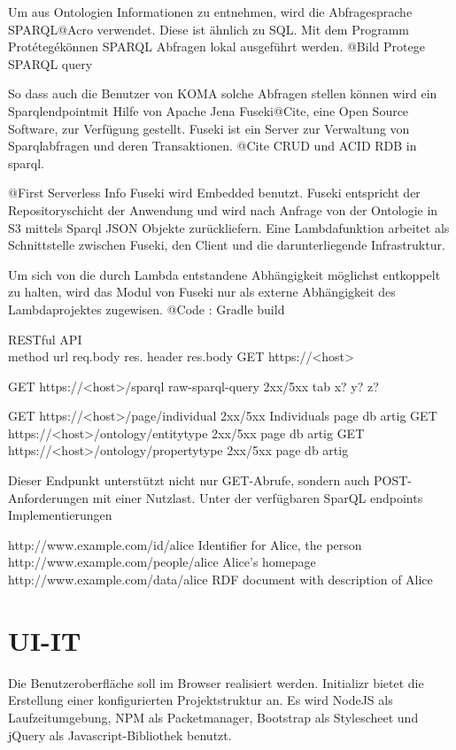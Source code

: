 \documentclass[
12pt,
english,
ngerman,
headsepline,
twoside,
openright,
numbers=noenddot,version=first
]{scrreprt}
\begin{document}
Um aus Ontologien Informationen zu entnehmen, wird die Abfragesprache \glqq SPARQL\grqq @Acro verwendet. Diese ist ähnlich zu SQL. Mit dem Programm \glqq Protétegé\grqq können SPARQL Abfragen lokal ausgeführt werden. 
@Bild Protege SPARQL query

So dass auch die Benutzer von KOMA solche Abfragen stellen können wird ein \glqq Sparqlendpoint\grqq mit Hilfe von Apache Jena Fuseki@Cite, eine Open Source Software, zur Verfügung gestellt. Fuseki ist ein Server zur Verwaltung von Sparqlabfragen und deren Transaktionen. @Cite CRUD und ACID RDB in sparql. 

@First Serverless Info
Fuseki wird Embedded benutzt.
Fuseki entspricht der Repositoryschicht der Anwendung und wird nach Anfrage von der Ontologie in S3 mittels Sparql JSON Objekte zurückliefern. 
Eine Lambdafunktion arbeitet als Schnittstelle zwischen Fuseki, den Client und die darunterliegende Infrastruktur. 

Um sich von die durch Lambda entstandene Abhängigkeit möglichst entkoppelt\cite{FlowerRefactoring} zu halten, wird das Modul von Fuseki nur als externe Abhängigkeit des Lambdaprojektes zugewisen. 
@Code : Gradle build\cite{Muschko2014}

RESTful API \\
method   url    req.body    res. header res.body
GET https://<host>

GET https://<host>/sparql raw-sparql-query    2xx/5xx     tab x? y? z?

GET https://<host>/page/individual 2xx/5xx Individuals page db artig\cite{Hunter2017}
GET https://<host>/ontology/entitytype 2xx/5xx  page db artig
GET https://<host>/ontology/propertytype 2xx/5xx  page db artig

Dieser Endpunkt unterstützt nicht nur GET-Abrufe, sondern auch POST-Anforderungen mit einer Nutzlast.
Unter der verfügbaren SparQL endpoints Implementierungen


http://www.example.com/id/alice
Identifier for Alice, the person
http://www.example.com/people/alice
Alice's homepage
http://www.example.com/data/alice
RDF document with description of Alice

\section{UI-IT}

Die Benutzeroberfläche soll im Browser realisiert werden. Initializr bietet die Erstellung einer konfigurierten Projektstruktur an. Es wird NodeJS als Laufzeitumgebung, NPM als Packetmanager, Bootstrap als Stylescheet und jQuery als Javascript-Bibliothek benutzt. 
\end{document}
